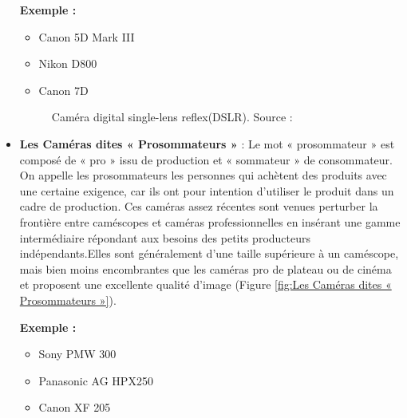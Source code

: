 \begin{itemize}
 	\textbf{Exemple :}
 	
 	\begin{itemize}
 		\item Canon 5D Mark III
 		\item Nikon D800
 		\item Canon 7D
 	\end{itemize}
 	
 	\begin{figure}[H]%
 		\center%
 		\setlength{\fboxsep}{5pt}%
 		\setlength{\fboxrule}{0.5pt}%
 	 \caption[digital single-lens reflex(DSLR)]{Caméra digital single-lens reflex(DSLR). Source :\cite{noauthor_les_2015}}
 	\label{fig:digital single-lens reflex(DSLR)}
 	\end{figure}
 	
 	\item \textbf{Les Caméras dites « Prosommateurs »} : Le mot « prosommateur » est composé de « pro » issu de production et « sommateur » de consommateur. On appelle les prosommateurs les personnes qui achètent des produits avec une certaine exigence, car ils ont pour intention d’utiliser le produit dans un cadre de production. Ces caméras assez récentes sont venues perturber la frontière entre caméscopes et caméras professionnelles en insérant une gamme intermédiaire répondant aux besoins des petits producteurs indépendants.Elles sont généralement d’une taille supérieure à un caméscope, mais bien moins encombrantes que les caméras pro de plateau ou de cinéma et proposent une excellente qualité d’image (Figure \ref{fig:Les Caméras dites « Prosommateurs »}).
 	
 	\textbf{Exemple :}
 	
 	\begin{itemize}
 		\item Sony PMW 300
 		\item Panasonic AG HPX250
 		\item Canon XF 205
 	\end{itemize}
  

\end{itemize}
